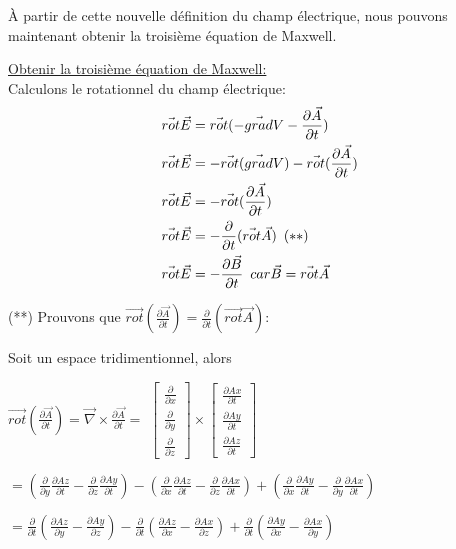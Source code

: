 \documentclass[12pt]{article}
\begin{document}
\noindent À partir de cette nouvelle définition du champ électrique, nous pouvons maintenant obtenir la troisième équation de Maxwell.

\noindent \underline{Obtenir la troisième équation de Maxwell:}
\\\noindent Calculons le rotationnel du champ électrique:
\begin{align*}
\vec{rot}\vec{E}&=\vec{rot}(-\vec{grad}V-\frac{\partial\vec{A}}{\partial t})
\\\vec{rot}\vec{E}&=-\vec{rot}(\vec{grad}V)-\vec{rot}(\frac{\partial\vec{A}}{\partial t} )
\\\vec{rot}\vec{E}&=-\vec{rot}(\frac{\partial\vec{A}}{\partial t})
\\\vec{rot}\vec{E}&=-\frac{\partial}{\partial t}(\vec{rot}\vec{A}) \hspace{0.5em}(**)
\\\vec{rot}\vec{E}&=-\frac{\partial\vec{B}}{\partial t} \hspace{0.5em} car \vec{B}=\vec{rot}{\vec{A}}
\end{align*}

\noindent (**) Prouvons que $\vec{rot}(\frac{\partial\vec{A}}{\partial t})=\frac{\partial}{\partial t}(\vec{rot}\vec{A})$:

\noindent Soit un espace tridimentionnel, alors 


\noindent $\vec{rot}(\frac{\partial\vec{A}}{\partial t}) = \vec{\nabla} \times \frac{\partial\vec{A}}{\partial t}= $
$\begin{bmatrix}
    \frac{\partial}{\partial x} \\
    \frac{\partial}{\partial y} \\
    \frac{\partial}{\partial z}
\end{bmatrix}
\times 
\begin{bmatrix}
    \frac{\partial Ax}{\partial t} \\
    \frac{\partial Ay}{\partial t} \\ 
    \frac{\partial Az}{\partial t}
\end{bmatrix}$


\noindent $=(\frac{\partial}{\partial y}\frac{\partial Az}{\partial t}-\frac{\partial}{\partial z}\frac{\partial Ay}{\partial t})-(\frac{\partial}{\partial x}\frac{\partial Az}{\partial t}-\frac{\partial}{\partial z}\frac{\partial Ax}{\partial t})+(\frac{\partial}{\partial x}\frac{\partial Ay}{\partial t}-\frac{\partial}{\partial y}\frac{\partial Ax}{\partial t})$

\noindent $=\frac{\partial}{\partial t} (\frac{\partial Az}{\partial y}-\frac{\partial Ay}{\partial z})-\frac{\partial}{\partial t} (\frac{\partial Az}{\partial x}-\frac{\partial Ax}{\partial z})+\frac{\partial}{\partial t} (\frac{\partial Ay}{\partial x}-\frac{\partial Ax}{\partial y})$
\end{document}
